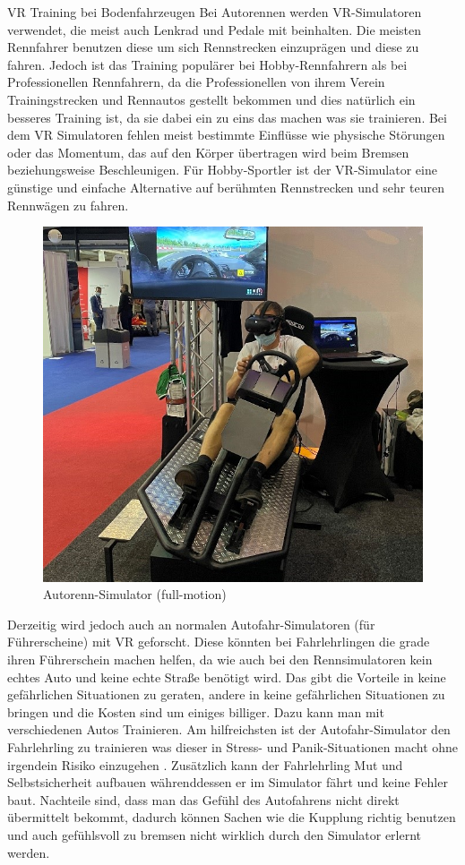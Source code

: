 VR Training bei Bodenfahrzeugen
Bei Autorennen werden VR-Simulatoren verwendet, die meist auch Lenkrad und Pedale mit beinhalten. Die meisten Rennfahrer benutzen diese um sich Rennstrecken einzuprägen und diese zu fahren. Jedoch ist das Training populärer bei Hobby-Rennfahrern als bei Professionellen Rennfahrern, da die Professionellen von ihrem Verein Trainingstrecken und Rennautos gestellt bekommen und dies natürlich ein besseres Training ist, da sie dabei ein zu eins das machen was sie trainieren. Bei dem VR Simulatoren fehlen meist bestimmte Einflüsse wie physische Störungen oder das Momentum, das auf den Körper übertragen wird beim Bremsen beziehungsweise Beschleunigen. Für Hobby-Sportler ist der VR-Simulator eine günstige und einfache Alternative auf berühmten Rennstrecken und sehr teuren Rennwägen zu fahren.
\\
\begin{figure}[!ht]
    \centering
    \includegraphics[width=1.0\textwidth]{images/Abbildung 2.jpg}
    \caption{\label{fig:Abbildung 2}Autorenn-Simulator (full-motion)\protect
    }
\end{figure}
Derzeitig wird jedoch auch an normalen Autofahr-Simulatoren (für Führerscheine) mit VR geforscht. Diese könnten bei Fahrlehrlingen die grade ihren Führerschein machen helfen, da wie auch bei den Rennsimulatoren kein echtes Auto und keine echte Straße benötigt wird. Das gibt die Vorteile in keine gefährlichen Situationen zu geraten, andere in keine gefährlichen Situationen zu bringen und die Kosten sind um einiges billiger. Dazu kann man mit verschiedenen Autos Trainieren. Am hilfreichsten ist der Autofahr-Simulator den Fahrlehrling zu trainieren was dieser in Stress- und Panik-Situationen macht ohne irgendein Risiko einzugehen \cite{ihemedu2017virtual}. Zusätzlich kann der Fahrlehrling Mut und Selbstsicherheit aufbauen währenddessen er im Simulator fährt und keine Fehler baut. Nachteile sind, dass man das Gefühl des Autofahrens nicht direkt übermittelt bekommt, dadurch können Sachen wie die Kupplung richtig benutzen und auch gefühlsvoll zu bremsen nicht wirklich durch den Simulator erlernt werden.

